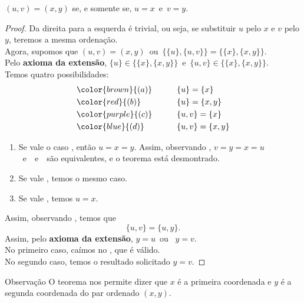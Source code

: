       \begin{theorem}
         $( u ,v) = ( x ,y)$ se, e somente se, $u = x$\ e\ $v = y$.
         \begin{proof}
            Da direita para a esquerda é trivial, ou seja, se substituir $u$ pelo $x$ e $v$ pelo $y$, teremos a mesma ordenação.\\
            Agora, supomos que $( u ,v) = ( x ,y)$\ ou\ $\{\{u\},\{u, v\}\} = \{\{x\},\{x, y\}\}.$\\
            Pelo \textbf{axioma da extensão}, $\{u\} \in \{\{x\},\{x, y\}\}$\ e\ $\{u, v\} \in \{\{x\},\{x, y\}\}.$\\
            Temos quatro possibilidades:
            \begin{alignat*}{3}
               &\color{brown}{(a)}& \quad \quad & \{u\} = \{x\}\\
               &\color{red}{(b)}& \quad \quad & \{u\} = \{x, y\}\\
               &\color{purple}{(c)}& \quad \quad & \{u, v\} = \{x\}\\
               &\color{blue}{(d)}& \quad \quad & \{u, v\} = \{x, y\}
            \end{alignat*}
            \begin{enumerate}[i]
               \item Se vale o caso \color{red}{(b)}\color{black}, então $u = x = y$. Assim, observando \color{blue}{(d)}\color{black}, $v = y = x = u$\ e\ \color{blue}{(d)}\color{black}\ e\ \color{purple}{(c)}\color{black}\ são equivalentes, e o teorema está desmontrado.
               \item Se vale \color{purple}{(c)}\color{black}, temos o mesmo caso.
               \item Se vale \color{brown}{(a)}\color{black}, temos $u = x$.  
            \end{enumerate}
            Assim, observando \color{blue}{(d)}\color{black}, temos que
            $$\{u, v\} = \{u, y\}.$$
            Assim, pelo \textbf{axioma da extensão}, $y = u$\ ou \ $y = v$.\\
            No primeiro caso, caímos no \color{red}{(b)}\color{black}, que é válido.\\
            No segundo caso, temos o resultado solicitado $y = v.$
         \end{proof}
      \end{theorem}
      \begin{mymdframed}{Observação}
         O teorema nos permite dizer que $x$ é a primeira coordenada e $y$ é a segunda coordenada do par ordenado $( x ,y)$.
      \end{mymdframed}


